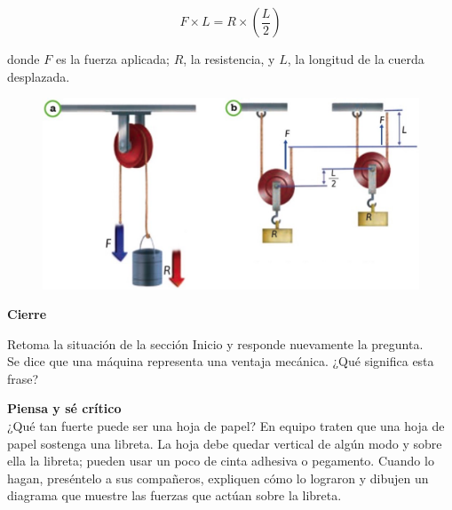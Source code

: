\documentclass[11pt]{book}
\begin{document}
\begin{equation}
  F \times L = R \times \left(\frac{L}{2}\right)
\end{equation}

donde $F$ es la fuerza aplicada; $R$, la resistencia, y $L$, la longitud de la cuerda desplazada.

\begin{figure}[H]
  \centering
  \includegraphics[width=0.9\linewidth]{poleas_fijas.jpg}
  \label{fig:poleas_fijas}
\end{figure}


\begin{boxK}
  \begin{center}\bfseries \color{colorrds} Cierre\end{center}
  Retoma la situación de la sección Inicio y responde nuevamente la pregunta.\\
  Se dice que una máquina representa una ventaja mecánica. ¿Qué significa esta frase?
\end{boxK}


\begin{boxH}
  \textbf{Piensa y sé crítico}\\
  ¿Qué tan fuerte puede ser una hoja de papel? En equipo traten que una hoja de
  papel sostenga una libreta. La hoja debe quedar vertical de algún modo y sobre
  ella la libreta; pueden usar un poco de cinta adhesiva o pegamento. Cuando lo hagan,
  preséntelo a sus compañeros, expliquen cómo lo lograron y dibujen un diagrama que
  muestre las fuerzas que actúan sobre la libreta.
\end{boxH}
\newpage
\end{document}
